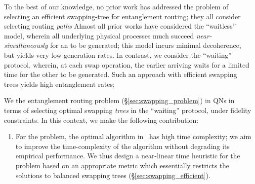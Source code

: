 To the best of our knowledge, no prior work has addressed the problem of selecting an efficient
swapping-tree for entanglement routing; they all consider selecting routing \textit{paths} 
Almost all prior works have considered the ``waitless''
model, wherein all underlying physical processes much succeed \textit{near-simultaneously} for 
an \eps to be generated; this model incurs minimal decoherence, but yields
very low \eps generation rates. 
In contrast, we consider the ``waiting'' protocol, wherein, at each swap operation, the earlier arriving 
\eps waits for a limited time for the other \eps to be generated. Such an approach with efficient swapping trees yields high entanglement rates; 

We  the entanglement routing problem (\S\ref{sec:swapping_problem})
in QNs in terms of selecting optimal swapping \textit{trees} in the ``waiting'' protocol, under fidelity
constraints. In this context, we make the following contribution:
\begin{enumerate}

\item
For the \spp problem, the optimal algorithm in~\cite{tqe22-quantum} has high time complexity; 
we aim to improve the time-complexity of the algorithm without degrading its empirical performance.
We thus design a near-linear time heuristic for the \spp problem based on an appropriate metric 
which essentially restricts the solutions to balanced swapping trees (\S\ref{sec:swapping_efficient}).

\end{enumerate}


